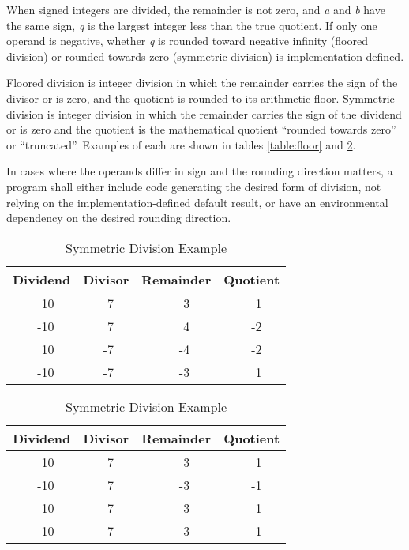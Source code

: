 When signed integers are divided, the remainder is not zero, and
\emph{a} and \emph{b} have the same sign, \emph{q} is the largest
integer less than the true quotient. If only one operand is
negative, whether \emph{q} is rounded toward negative infinity
(floored division) or rounded towards zero (symmetric division) is
implementation defined.

Floored division is integer division in which the remainder carries
the sign of the divisor or is zero, and the quotient is rounded to
its arithmetic floor. Symmetric division is integer division in
which the remainder carries the sign of the dividend or is zero and
the quotient is the mathematical quotient ``rounded towards zero''
or ``truncated''. Examples of each are shown in tables
\ref{table:floor} and \ref{table:round}.

In cases where the operands differ in sign and the rounding
direction matters, a program shall either include code generating
the desired form of division, not relying on the
implementation-defined default result, or have an environmental
dependency on the desired rounding direction.

\begin{table}[ht]
\begin{center}
  \begin{minipage}{0.48\textwidth}
	\begin{center}
		\caption{Floored Division Example}

		\label{table:floor}
		\begin{tabular}{lrllrllrllrl}
		\hline\hline
		\multicolumn{3}{c}{Dividend} &
		\multicolumn{3}{c}{Divisor} &
		\multicolumn{3}{c}{Remainder} &
		\multicolumn{3}{c}{Quotient} \\
		\hline
		&  10 &&&  7 &&&  3 &&&  1 \\
		& -10 &&&  7 &&&  4 &&& -2 \\
		&  10 &&& -7 &&& -4 &&& -2 \\
		& -10 &&& -7 &&& -3 &&&  1 \\
		\hline\hline
		\end{tabular}
	\end{center}
  \end{minipage}
  \begin{minipage}{0.48\textwidth}
	\begin{center}
		\caption{Symmetric Division Example}
		\label{table:round}
		\begin{tabular}{lrllrllrllrl}
		\hline\hline
		\multicolumn{3}{c}{Dividend} &
		\multicolumn{3}{c}{Divisor} &
		\multicolumn{3}{c}{Remainder} &
		\multicolumn{3}{c}{Quotient} \\
		\hline
		&  10 &&&  7 &&&  3 &&&  1 \\
		& -10 &&&  7 &&& -3 &&& -1 \\
		&  10 &&& -7 &&&  3 &&& -1 \\
		& -10 &&& -7 &&& -3 &&&  1 \\
		\hline\hline
		\end{tabular}
	\end{center}
  \end{minipage}
\end{center}
\end{table}

